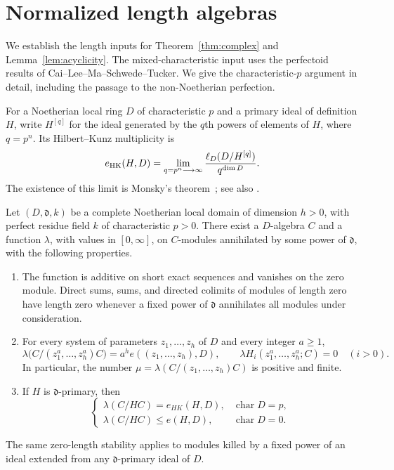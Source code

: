 \section{Normalized length algebras}
\label{sec:lengths}

We establish the length inputs for Theorem~\ref{thm:complex} and
Lemma~\ref{lem:acyclicity}.  The mixed-characteristic input uses the
perfectoid results of Cai--Lee--Ma--Schwede--Tucker.  We give the
characteristic-$p$ argument in detail, including the passage to the
non-Noetherian perfection.

For a Noetherian local ring $D$ of characteristic $p$ and a primary
ideal of definition $H$, write $H^{[q]}$ for the ideal generated by the
$q$th powers of elements of $H$, where $q=p^n$. Its Hilbert--Kunz
multiplicity is
\[
 e_{\mathrm{HK}}(H,D)
   =\lim_{q=p^n\longrightarrow\infty}
        \frac{\operatorname{\ell}_D(D/H^{[q]})}{q^{\dim D}}.
\]
The existence of this limit is Monsky's theorem~\cite{Monsky}; see
also \cite[Section~2.2]{Ma}.

\begin{theorem}\label{thm:length-inputs}
Let $(D,\mathfrak d,k)$ be a complete Noetherian local domain of dimension
$h>0$, with perfect residue field $k$ of characteristic $p>0$.
There exist a $D$-algebra $C$ and a function $\lambda$, with values in
$[0,\infty]$, on $C$-modules annihilated by some power of $\mathfrak d$,
with the following properties.
\begin{enumerate}
\item The function is additive on short exact sequences and vanishes on
the zero module.  Direct sums, sums, and directed colimits of modules of
length zero have length zero whenever a fixed power of $\mathfrak d$
annihilates all modules under consideration.
\item For every system of parameters $z_1,\ldots,z_h$ of $D$ and every
integer $a\geq 1$,
\[
 \lambda\bigl(C/(z_1^a,\ldots,z_h^a)C\bigr)
   =a^h e((z_1,\ldots,z_h),D),
 \qquad
 \lambda H_i(z_1^a,\ldots,z_h^a;C)=0\quad(i>0).
\]
In particular, the number
$\mu=\lambda(C/(z_1,\ldots,z_h)C)$ is positive and finite.
\item If $H$ is $\mathfrak d$-primary, then
\[
 \begin{cases}
 \lambda(C/HC)=e_{HK}(H,D),&\operatorname{char}D=p,\\
 \lambda(C/HC)\leq e(H,D),&\operatorname{char}D=0.
 \end{cases}
\]
\end{enumerate}
The same zero-length stability applies to modules killed by a fixed
power of an ideal extended from any $\mathfrak d$-primary ideal of $D$.
\end{theorem}

